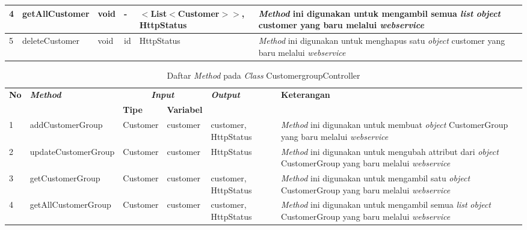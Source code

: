 \begin{table}[H]
	\centering
	\small
	\begin{adjustbox}{width=1\textwidth}	
		\begin{tabular}{|p{0.4cm}|p{2.5cm}|p{1cm}|p{1.1cm}|p{3.4cm}|p{3cm}|}
			\hline
			4 & getAllCustomer & void & - & $<$List$<$Customer$>$$>$, HttpStatus & \textit{Method} ini digunakan untuk mengambil semua \textit{list} \textit{object} customer yang baru melalui \textit{webservice}\\
			\hline
			5 & deleteCustomer & void & id &HttpStatus & \textit{Method} ini digunakan untuk menghapus satu \textit{object} customer yang baru melalui \textit{webservice}\\
			\hline
		\end{tabular}
	\end{adjustbox}
\end{table}
\begin{table}[H]
	\caption{Daftar \textit{Method} pada \textit{Class} CustomergroupController}
	\centering
	\small
	\begin{adjustbox}{width=1\textwidth}	
		\begin{tabular}{|p{0.4cm}|p{3.5cm}|p{1.4cm}|p{1.7cm}|p{1.55cm}|p{3cm}|}
			\hline
			\multirow{2}{*}{\textbf{No}} & \multirow{2}{*}{\textit{\textbf{Method}}} & \multicolumn{2}{c|}{\textit{\textbf{Input}}} & \multirow{2}{*}{\textit{\textbf{Output}}} & 
			\multirow{2}{*}{\textbf{Keterangan}}\\
			\cline{3-4}
			& & \textbf{Tipe} & \textbf{Variabel} & & \\
			\hline
			1 & addCustomerGroup & Customer & customer & customer, HttpStatus & \textit{Method} ini digunakan untuk membuat \textit{object} CustomerGroup yang baru melalui \textit{webservice}\\
			\hline
			2 & updateCustomerGroup & Customer & customer & HttpStatus & \textit{Method} ini digunakan untuk mengubah attribut dari \textit{object} CustomerGroup yang baru melalui \textit{webservice}\\
			\hline
			3 & getCustomerGroup & Customer & customer & customer, HttpStatus & \textit{Method} ini digunakan untuk mengambil satu \textit{object} CustomerGroup yang baru melalui \textit{webservice}\\
			\hline
			4 & getAllCustomerGroup & Customer & customer & customer, HttpStatus & \textit{Method} ini digunakan untuk mengambil semua \textit{list} \textit{object} CustomerGroup yang baru melalui \textit{webservice}\\
			\hline
		\end{tabular}
	\end{adjustbox}
\end{table}
